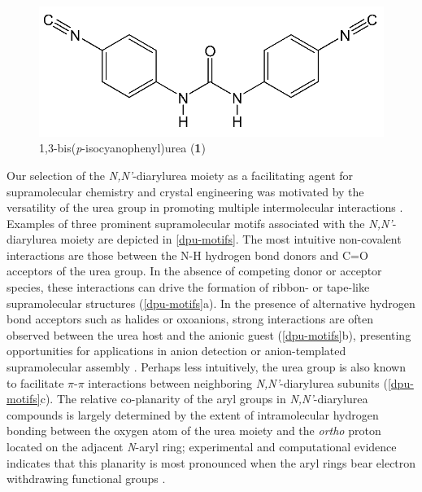\begin{figure}[h!]
    \centering
    \includegraphics[width=0.8\linewidth]{figures/pub2/dpu-structure.png}
    \caption{1,3-bis(\textit{p}-isocyanophenyl)urea (\textbf{1})}\label{dpu-structure}
\end{figure}

Our selection of the \textit{N,N'}-diarylurea moiety as a facilitating agent for supramolecular chemistry and crystal engineering was motivated by the versatility of the urea group in promoting multiple intermolecular interactions  \citep{Schneider2009, Custelcean2008, Volz2011, Fischer2010, Pulka-Ziach2017}.
Examples of three prominent supramolecular motifs associated with the \textit{N,N'}-diarylurea moiety are depicted in \autoref{dpu-motifs}. 
The most intuitive non-covalent interactions are those between the N-H hydrogen bond donors and C=O acceptors of the urea group. 
In the absence of competing donor or acceptor species, these interactions can drive the formation of ribbon- or tape-like supramolecular structures (\autoref{dpu-motifs}a)\citep{Custelcean2008}. 
In the presence of alternative hydrogen bond acceptors such as halides or oxoanions, strong interactions are often observed between the urea host and the anionic guest (\autoref{dpu-motifs}b), presenting opportunities for applications in anion detection or anion-templated supramolecular assembly \citep{Custelcean2008, BlazekBregovic2015, Li2010d, Pfeifer2016, Boiocchi2004, Amendola2013, Esteban-Gomez2005, Amendola2010, Custelcean2006, Evans2014, Gale2011, Busschaert2015, Custelcean2010}. 
Perhaps less intuitively, the urea group is also known to facilitate $\pi$-$\pi$ interactions between neighboring \textit{N,N'}-diarylurea subunits (\autoref{dpu-motifs}c). 
The relative co-planarity of the aryl groups in \textit{N,N'}-diarylurea compounds is largely determined by the extent of intramolecular hydrogen bonding between the oxygen atom of the urea moiety and the \textit{ortho} proton located on the adjacent \textit{N}-aryl ring; experimental and computational evidence indicates that this planarity is most pronounced when the aryl rings bear electron withdrawing functional groups \citep{Custelcean2006, Reddy2007, Etter1990a, Etter1990, Etter1988a}.

